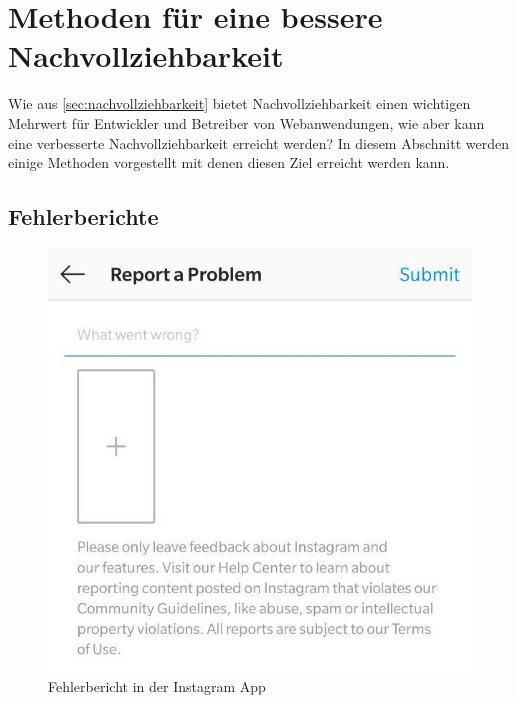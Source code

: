 

\section{Methoden für eine bessere Nachvollziehbarkeit}
\label{sec:methoden}

Wie aus \autoref{sec:nachvollziehbarkeit} bietet Nachvollziehbarkeit einen wichtigen Mehrwert für Entwickler und Betreiber von Webanwendungen, wie aber kann eine verbesserte Nachvollziehbarkeit erreicht werden? In diesem Abschnitt werden einige Methoden vorgestellt mit denen diesen Ziel erreicht werden kann.

\subsection{Fehlerberichte}

\begin{figure}
\centering
\includegraphics[width=\linewidth]{img/instagram-feedback/instagram-feedback.jpg}
\caption{Fehlerbericht in der Instagram App \cite{Instagram}}
\label{fig:instagram-bug-report}
\end{figure}

